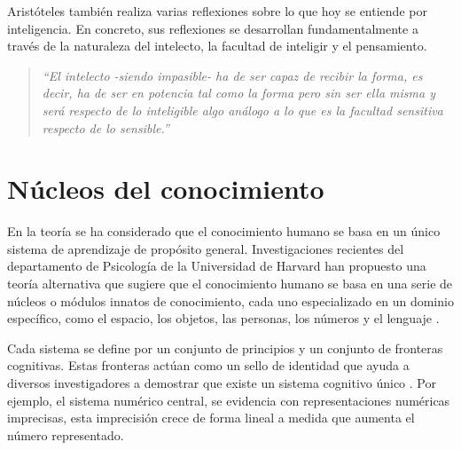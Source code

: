\documentclass[11pt,a4paper,spanish]{book}
\numberwithin{equation}{chapter}
\numberwithin{figure}{chapter}
\begin{document}


Aristóteles también realiza varias reflexiones sobre lo que hoy se entiende por inteligencia. En concreto, sus reflexiones se desarrollan fundamentalmente a 
través de la naturaleza del intelecto, la facultad de inteligir y el pensamiento.

\begin{quote}
\itshape
``El intelecto -siendo impasible- ha de ser capaz de recibir la forma, es decir, ha de ser en potencia tal como la forma pero sin ser ella misma y será 
respecto de lo inteligible algo análogo a lo que es la facultad sensitiva respecto de lo sensible.''
\end{quote}

\begin{center}
\cite[p.~230, párr.~1]{aristotle2010acerca}
\end{center}

\section{Núcleos del conocimiento}

En la teoría se ha considerado que el conocimiento humano se basa en un único sistema de aprendizaje de propósito general. Investigaciones recientes del departamento
de Psicología de la Universidad de Harvard han propuesto una teoría alternativa que sugiere que el conocimiento humano se basa en una serie de núcleos o módulos innatos 
de conocimiento, cada uno especializado en un dominio específico, como el espacio, los objetos, las personas, los números y el lenguaje \cite{spelke2007core}.

Cada sistema se define por un conjunto de principios y un conjunto de fronteras cognitivas. Estas fronteras actúan como un sello de identidad que ayuda a diversos 
investigadores a demostrar que existe un sistema cognitivo único \cite{spelke2007core}. Por ejemplo, el sistema numérico central, se evidencia con representaciones numéricas
imprecisas, esta imprecisión crece de forma lineal a medida que aumenta el número representado.
\end{document}
